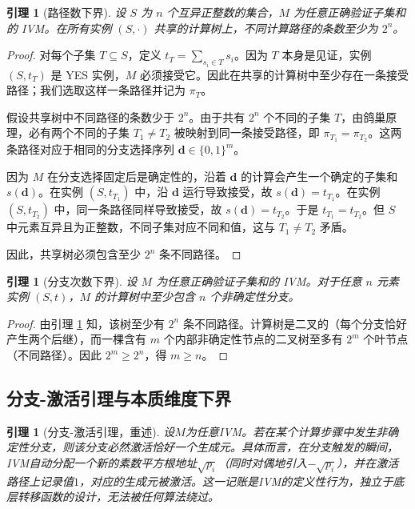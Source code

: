 \documentclass{ctexart}
\newtheorem{lemma}[theorem]{引理}
\newtheorem{proof}[theorem]{证明}
\begin{document}
	\begin{lemma}[路径数下界]\label{lem:path-count}
		设 $S$ 为 $n$ 个互异正整数的集合，$M$ 为任意正确验证子集和的 IVM。在所有实例 $(S, \cdot)$ 共享的计算树上，不同计算路径的条数至少为 $2^n$。
	\end{lemma}
	\begin{proof}
		对每个子集 $T \subseteq S$，定义 $t_T = \sum_{s_i \in T} s_i$。因为 $T$ 本身是见证，实例 $(S, t_T)$ 是 YES 实例，$M$ 必须接受它。因此在共享的计算树中至少存在一条接受路径；我们选取这样一条路径并记为 $\pi_T$。
		
		假设共享树中不同路径的条数少于 $2^n$。由于共有 $2^n$ 个不同的子集 $T$，由鸽巢原理，必有两个不同的子集 $T_1 \neq T_2$ 被映射到同一条接受路径，即 $\pi_{T_1} = \pi_{T_2}$。这两条路径对应于相同的分支选择序列 $\mathbf{d} \in \{0,1\}^m$。
		
		因为 $M$ 在分支选择固定后是确定性的，沿着 $\mathbf{d}$ 的计算会产生一个确定的子集和 $s(\mathbf{d})$。在实例 $(S, t_{T_1})$ 中，沿 $\mathbf{d}$ 运行导致接受，故 $s(\mathbf{d}) = t_{T_1}$。在实例 $(S, t_{T_2})$ 中，同一条路径同样导致接受，故 $s(\mathbf{d}) = t_{T_2}$。于是 $t_{T_1} = t_{T_2}$。但 $S$ 中元素互异且为正整数，不同子集对应不同和值，这与 $T_1 \neq T_2$ 矛盾。
		
		因此，共享树必须包含至少 $2^n$ 条不同路径。
	\end{proof}
	
	\begin{lemma}[分支次数下界]\label{lem:branch-count}
		设 $M$ 为任意正确验证子集和的 IVM。对于任意 $n$ 元素实例 $(S, t)$，$M$ 的计算树中至少包含 $n$ 个非确定性分支。
	\end{lemma}
	\begin{proof}
		由引理 \ref{lem:path-count} 知，该树至少有 $2^n$ 条不同路径。计算树是二叉的（每个分支恰好产生两个后继），而一棵含有 $m$ 个内部非确定性节点的二叉树至多有 $2^m$ 个叶节点（不同路径）。因此 $2^m \ge 2^n$，得 $m \ge n$。
	\end{proof}
	
	
	\subsection{分支-激活引理与本质维度下界}
	
	\begin{lemma}[分支-激活引理，重述]\label{lem:branch-activate-2}
		设$M$为任意IVM。若在某个计算步骤中发生非确定性分支，则该分支必然激活恰好一个生成元。具体而言，在分支触发的瞬间，IVM自动分配一个新的素数平方根地址$\sqrt{p_i}$（同时对偶地引入$-\sqrt{p_i}$），并在激活路径上记录值$1$，对应的生成元被激活。这一记账是IVM的定义性行为，独立于底层转移函数的设计，无法被任何算法绕过。
	\end{lemma}
	
\end{document}

